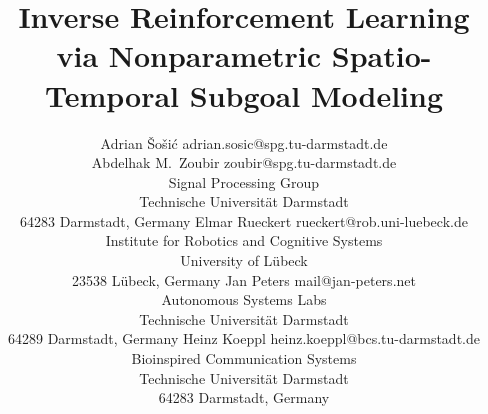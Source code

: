 \documentclass[twoside,11pt]{article}
\begin{document}
%
%

\title{Inverse Reinforcement Learning \\ via Nonparametric Spatio-Temporal Subgoal Modeling}

\author{\name Adrian \v{S}o\v{s}i\'c \email adrian.sosic@spg.tu-darmstadt.de \\
       \name Abdelhak M.\ Zoubir \email zoubir@spg.tu-darmstadt.de \\
       \addr Signal Processing Group \\
       Technische Universit\"at Darmstadt \\
       64283 Darmstadt, Germany
       \AND
       \name Elmar Rueckert \email rueckert@rob.uni-luebeck.de \\
       \addr Institute for Robotics and Cognitive Systems \\
       University of L\"ubeck \\
       23538 L\"ubeck, Germany
       \AND
       \name Jan Peters \email mail@jan-peters.net \\
       \addr Autonomous Systems Labs \\
       Technische Universit\"at Darmstadt \\
       64289 Darmstadt, Germany
%
%
%
%
%
%
%
%
%
%
        \AND
        \name Heinz Koeppl \email heinz.koeppl@bcs.tu-darmstadt.de \\
        \addr Bioinspired Communication Systems \\
        Technische Universit\"at Darmstadt \\
       64283 Darmstadt, Germany}

\editor{}

\maketitle
\end{document}
